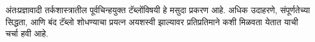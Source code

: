 \documentclass[../../../include/open-logic-chapter]{subfiles}
\begin{document}

\begin{editorial}
  अंतःप्रज्ञावादी तर्कशास्त्रातील पूर्वचिन्हयुक्त
  टॅब्लोंविषयी हे मसुदा प्रकरण आहे.
  अधिक उदाहरणे, संपूर्णतेच्या सिद्धता,
  आणि बंद टॅब्लो शोधण्याचा प्रयत्न
  अयशस्वी झाल्यावर प्रतिप्रतिमाने कशी
  मिळवता येतात याची चर्चा हवी आहे.
\end{editorial}


\OLEndChapterHook
\end{document}
